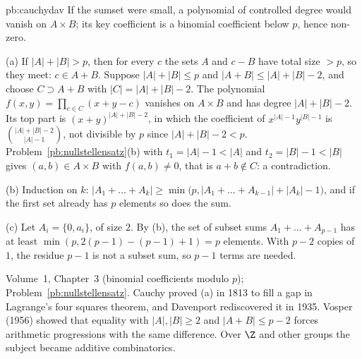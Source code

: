 \begin{solution}{pb:cauchydav}
\idea If the sumset were small, a polynomial of controlled degree would vanish on $A\times B$; its key coefficient is a binomial
coefficient below $p$, hence non-zero.

\writeup (a) If $|A|+|B|>p$, then for every $c$ the sets $A$ and $c-B$ have total size $>p$, so they meet: $c\in A+B$. Suppose
$|A|+|B|\le p$ and $|A+B|\le|A|+|B|-2$, and choose $C\supset A+B$ with $|C|=|A|+|B|-2$. The polynomial
$f(x,y)=\prod_{c\in C}(x+y-c)$ vanishes on $A\times B$ and has degree $|A|+|B|-2$. Its top part is $(x+y)^{|A|+|B|-2}$, in which
the coefficient of $x^{|A|-1}y^{|B|-1}$ is $\binom{|A|+|B|-2}{|A|-1}$, not divisible by $p$ since $|A|+|B|-2<p$. Problem~\ref{pb:nullstellensatz}(b)
with $t_1=|A|-1<|A|$ and $t_2=|B|-1<|B|$ gives $(a,b)\in A\times B$ with $f(a,b)\ne0$, that is $a+b\notin C$: a contradiction.

(b) Induction on $k$: $|A_1+\dots+A_k|\ge\min\bigl(p,|A_1+\dots+A_{k-1}|+|A_k|-1\bigr)$, and if the first set already has $p$
elements so does the sum.

(c) Let $A_i=\{0,a_i\}$, of size $2$. By (b), the set of subset sums $A_1+\dots+A_{p-1}$ has at least
$\min(p,2(p-1)-(p-1)+1)=p$ elements. With $p-2$ copies of $1$, the residue $p-1$ is not a subset sum, so $p-1$ terms are needed.

\tools Volume~1, Chapter~3 (binomial coefficients modulo $p$); Problem~\ref{pb:nullstellensatz}.
\leads Cauchy proved (a) in 1813 to fill a gap in Lagrange's four squares theorem, and Davenport rediscovered it in 1935. Vosper
(1956) showed that equality with $|A|,|B|\ge2$ and $|A+B|\le p-2$ forces arithmetic progressions with the same difference. Over
$\Z$ and other groups the subject became additive combinatorics.
\end{solution}

